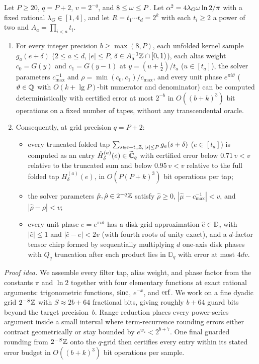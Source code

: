 \begin{lemma}\label{lem:phase-tables}
Let $P\ge 20$, $q=P+2$, $v=2^{-q}$, and $8\le\omega\le P$. Let $\alpha^2=4\lambda_G\omega\ln 2/\pi$ with a fixed rational
$\lambda_G\in[1,4]$, and let $R=t_1\cdots t_d=2^k$ with each $t_i\ge 2$ a power of two and $A_a=\prod_{i<a}t_i$.
\begin{enumerate}[label=(\alph*),leftmargin=*]
  \item For every integer precision $b\ge\max(8,P)$, each unfolded kernel sample $g_a(e+\delta)$ ($2\le a\le d$,
    $|e|\le P$, $\delta\in A_a^{-1}\mathbb{Z}\cap[0,1)$), each alias weight $c_0=G(y)$ and $c_1=G(y-1)$ at
    $y=(u+\tfrac12)/t_a$ ($u\in[t_a]$), the solver parameters $c_{\max}^{-1}$ and $\rho=\min(c_0,c_1)/c_{\max}$, and
    every unit phase $e^{\pi i\vartheta}$ ($\vartheta\in\mathbb{Q}$ with $O(k+\lg P)$-bit numerator and denominator) can be
    computed deterministically with certified error at most $2^{-b}$ in $O((b+k)^3)$ bit operations on a fixed number of
    tapes, without any transcendental oracle.
  \item Consequently, at grid precision $q=P+2$:
    \begin{itemize}[nosep,leftmargin=*]
      \item every truncated folded tap $\sum_{s\in e+t_a\mathbb{Z},\,|s|\le P}g_a(s+\delta)$ ($e\in[t_a]$) is computed as an
        entry $\hat H^{(a)}_\delta(e)\in\widetilde{\mathbb{C}}_q$ with certified error below $0.71\,v<v$ relative to the truncated sum and
        below $0.95\,v<v$ relative to the full folded tap $H^{(a)}_\delta(e)$, in $O(P(P+k)^3)$ bit operations per tap;
      \item the solver parameters $\hat\mu,\hat\rho\in 2^{-q}\mathbb{Z}$ satisfy $\hat\rho\ge 0$, $|\hat\mu-c_{\max}^{-1}|<v$,
        and $|\hat\rho-\rho|<v$;
      \item every unit phase $e=e^{\pi i\vartheta}$ has a disk-grid approximation $\hat e\in\mathbb{D}_q$ with
        $|\hat e|\le 1$ and $|\hat e-e|<2v$ (with fourth roots of unity exact), and a $d$-factor tensor chirp formed by
        sequentially multiplying $d$ one-axis disk phases with $Q_q$ truncation after each product lies in
        $\mathbb{D}_q$ with error at most $4dv$.
    \end{itemize}
\end{enumerate}
\end{lemma}

\emph{Proof idea.}
We assemble every filter tap, alias weight, and phase factor from the constants $\pi$ and $\ln 2$ together with four elementary functions at exact rational arguments: trigonometric functions, $\operatorname{sinc}$, $e^{-x}$, and $\operatorname{erf}$. We work on a fine dyadic grid $2^{-S}\mathbb{Z}$ with $S\approx 2b+64$ fractional bits, giving roughly $b+64$ guard bits beyond the target precision~$b$. Range reduction places every power-series argument inside a small interval where term-recurrence rounding errors either contract geometrically or stay bounded by $e^{w_z}<2^{b+7}$. One final guarded rounding from $2^{-S}\mathbb{Z}$ onto the $q$-grid then certifies every entry within its stated error budget in $O((b+k)^3)$ bit operations per sample.

